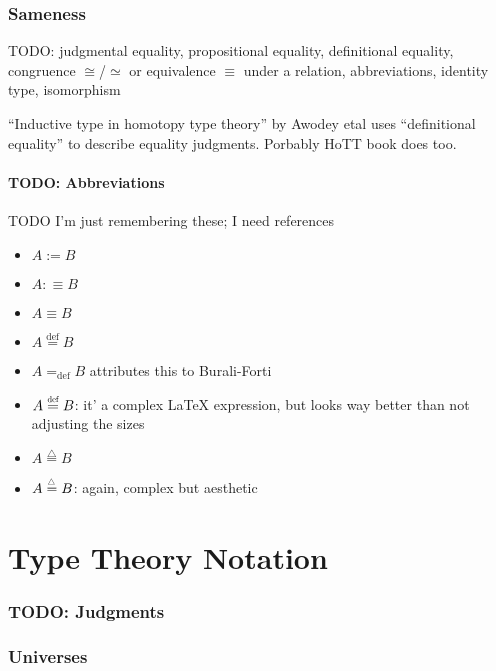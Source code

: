 \documentclass[11pt]{article} %
\theoremstyle{definition}
\theoremstyle{remark}
\begin{document}
\section{Sameness}

TODO: judgmental equality, propositional equality, definitional equality, congruence $\cong$/$\simeq$ or equivalence $\equiv$ under a relation, abbreviations, identity type, isomorphism

``Inductive type in homotopy type theory'' by Awodey etal uses ``definitional equality'' to describe equality judgments. Porbably HoTT book does too.

\subsection{TODO: Abbreviations}

TODO I'm just remembering these; I need references

\begin{itemize}
  \item $A \mathbin{:=} B$
  \item $A \mathbin{:\equiv} B$
  \item $A \mathbin{\equiv} B$ \cite{martin-lof_1984}
  \item $A \stackrel{\mathrm{def}}= B$
  \item $A =_\mathrm{def} B$ \cite{martin-lof_1984} attributes this to Burali-Forti
  \item $A \mathrel{\overset{\mathclap{\scalebox{0.6}{\text{def}}}}{\scalebox{1.1}[1]=}} B$:
    it' a complex \LaTeX{} expression, but looks way better than not adjusting the sizes
  \item $A \stackrel{\triangle}= B$
  \item $A \mathrel{\overset{\scalebox{0.6}{$\triangle$}}=} B$:
    again, complex but aesthetic
\end{itemize}


\part{Type Theory Notation}

\section{TODO: Judgments}

\section{Universes}
\end{document}
